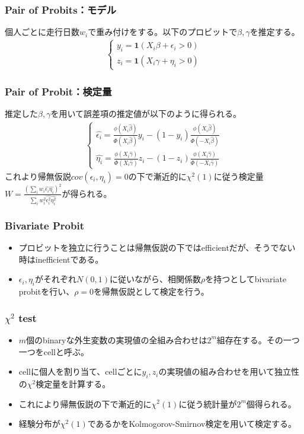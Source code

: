 \documentclass[dvipdfmx, 12pt]{beamer}
\begin{document}
\begin{frame}\frametitle{Pair of Probits：モデル}
個人ごとに走行日数$w_i$で重み付けをする。以下のプロビットで$\beta, \gamma$を推定する。
	\begin{align*}
	\begin{cases}
	y_i = {\bm 1}(X_i \beta + \epsilon_i > 0)\\[8pt]
	z_i = {\bm 1}(X_i \gamma + \eta_i > 0)
	\end{cases}
	\end{align*}
\end{frame}

\begin{frame}\frametitle{Pair of Probit：検定量}
推定した$\beta, \gamma$を用いて誤差項の推定値が以下のように得られる。
\begin{align*}
\begin{cases}
	\hat{\epsilon_i} = \frac{\phi(X_i \hat{\beta})}{\Phi(X_i \hat{\beta})} y_i - (1 - y_i) \frac{\phi(X_i \hat{\beta})}{\Phi(-X_i \hat{\beta})}\\[8pt]
	\hat{\eta_i} = \frac{\phi(X_i \hat{\gamma})}{\Phi(X_i \hat{\gamma})} z_i - (1 - z_i) \frac{\phi(X_i \hat{\gamma})}{\Phi(-X_i \hat{\gamma})}
\end{cases}
\end{align*}
これより帰無仮説$cov(\epsilon_i, \eta_i) = 0$の下で漸近的に$\chi^2(1)$に従う検定量$W = \frac{\left( \sum_{i} w_i \hat{\epsilon_i} \hat{\eta_i} \right)^2}{\sum_{i} w_i^2\hat{\epsilon_i^2}\hat{\eta_i^2}}$が得られる。
\end{frame}

\begin{frame}\frametitle{Bivariate Probit}
	\begin{itemize}
	\item プロビットを独立に行うことは帰無仮説の下ではefficientだが、そうでない時はinefficientである。
	\item $\epsilon_i, \eta_i$がそれぞれ$N(0,1)$に従いながら、相関係数$\rho$を持つとしてbivariate probitを行い、$\rho = 0$を帰無仮説として検定を行う。
	\end{itemize}
\end{frame}

\begin{frame}\frametitle{$\chi^2$ test}
	\begin{itemize}
	\item $m$個のbinaryな外生変数の実現値の全組み合わせは$2^m$組存在する。その一つ一つをcellと呼ぶ。
	\item cellに個人を割り当て、cellごとに$y_i, z_i$の実現値の組み合わせを用いて独立性の$\chi^2$検定量を計算する。
	\item これにより帰無仮説の下で漸近的に$\chi^2(1)$に従う統計量が$2^m$個得られる。
	\item 経験分布が$\chi^2(1)$であるかをKolmogorov-Smirnov検定を用いて検定する。
	\end{itemize}
\end{frame}
\end{document}
